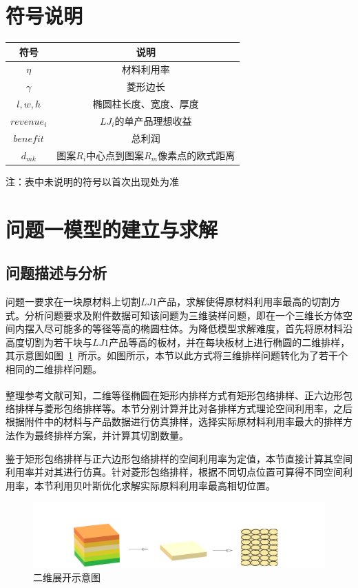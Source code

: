 \documentclass{whutmod}
\newcommand{\upcite}[1]{\textsuperscript{\cite{#1}}}
\begin{document}
	\section{符号说明}
		\begin{table}[H]
		\centering
		\setlength{\tabcolsep}{12mm}
		\begin{tabular}{cc}
			\toprule[1.5pt]
			\multicolumn{1}{m{2cm}}{\centering 符号} & \multicolumn{1}{m{10cm}}{\centering 说明} \\
			\midrule[1pt]		
			$\eta$  & 材料利用率 \\ 
			$\gamma$  & 菱形边长  \\ 
		   	$l,w,h$  & 椭圆柱长度、宽度、厚度\\ 
		   	$revenue_i$  & $LJ_i$的单产品理想收益\\ 
		   	$benefit$  & 总利润\\ 
		   	$d_{mk}$  &图案$R_i$中心点到图案$R_m$像素点的欧式距离\\ 
			\bottomrule[1.5pt]
		\end{tabular}
		\begin{tablenotes}
		\item 注：表中未说明的符号以首次出现处为准
		\end{tablenotes}
		\end{table}

	\section{问题一模型的建立与求解}
		\subsection{问题描述与分析}
		问题一要求在一块原材料上切割$LJ1$产品，求解使得原材料利用率最高的切割方式。分析问题要求及附件数据可知该问题为三维装样问题，即在一个三维长方体空间内摆入尽可能多的等径等高的椭圆柱体。为降低模型求解难度，首先将原材料沿高度切割为若干块与$LJ1$产品等高的板材，并在每块板材上进行椭圆的二维排样，其示意图如图~\ref{adffdas}~所示。如图所示，本节以此方式将三维排样问题转化为了若干个相同的二维排样问题。
			
		整理参考文献可知\upcite{1,2,3}，二维等径椭圆在矩形内排样方式有矩形包络排样、正六边形包络排样与菱形包络排样等。本节分别计算并比对各排样方式理论空间利用率，之后根据附件中的材料与产品数据进行仿真排样，选择实际原材料利用率最大的排样方法作为最终排样方案，并计算其切割数量。

		鉴于矩形包络排样与正六边形包络排样的空间利用率为定值，本节直接计算其空间利用率并对其进行仿真。针对菱形包络排样，根据不同切点位置可算得不同空间利用率，本节利用贝叶斯优化求解实际原料利用率最高相切位置。
		\begin{figure}[H]
		\centering
		\includegraphics[width=\textwidth]{figures/11.png}
		\caption{二维展开示意图}\label{adffdas}
		\end{figure}
\end{document}

